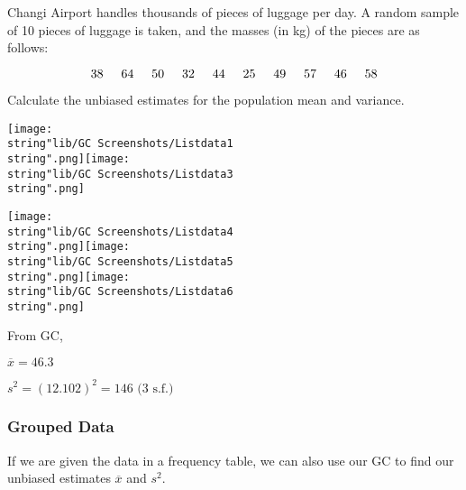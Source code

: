 \documentclass[11pt,a4paper]{book}
\begin{document}
\begin{example}

Changi Airport handles thousands of pieces of luggage per day. A random
sample of 10 pieces of luggage is taken, and the masses (in kg) of
the pieces are as follows:

\[
38\hspace{0.5cm}64\hspace{0.5cm}50\hspace{0.5cm}32\hspace{0.5cm}44\hspace{0.5cm}25\hspace{0.5cm}49\hspace{0.5cm}57\hspace{0.5cm}46\hspace{0.5cm}58
\]

Calculate the unbiased estimates for the population mean and variance.

\Solution

\texttt{[image: \\string"lib/GC Screenshots/Listdata1\\string".png]}\hspace{1cm}\texttt{[image: \\string"lib/GC Screenshots/Listdata3\\string".png]}

\texttt{[image: \\string"lib/GC Screenshots/Listdata4\\string".png]}\hspace{1cm}\texttt{[image: \\string"lib/GC Screenshots/Listdata5\\string".png]}\hspace{1cm}\texttt{[image: \\string"lib/GC Screenshots/Listdata6\\string".png]}

From GC,

$\overline{x}=46.3$

$s^{2}=\left(12.102\right)^{2}=146\text{ (3 s.f.)}$

\end{example}

\subsubsection{Grouped Data}

If we are given the data in a frequency table, we can also use our
GC to find our unbiased estimates $\overline{x}$ and $s^{2}$.
\end{document}
